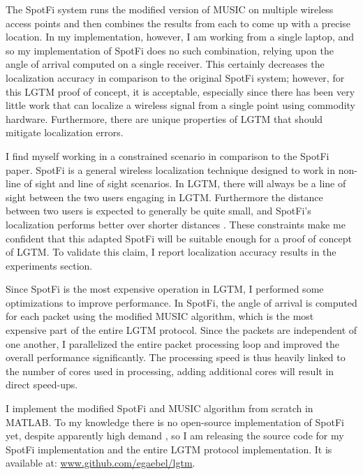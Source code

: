 \documentclass[12pt]{report}
\begin{document}
The SpotFi system runs the modified version of MUSIC on multiple wireless access points and then combines the results from each to come up with a precise location. In my implementation, however, I am working from a single laptop, and so my implementation of SpotFi does no such combination, relying upon the angle of arrival computed on a single receiver. This certainly decreases the localization accuracy in comparison to the original SpotFi system; however, for this LGTM proof of concept, it is acceptable, especially since there has been very little work that can localize a wireless signal from a single point using commodity hardware. Furthermore, there are unique properties of LGTM that should mitigate localization errors. \par

I find myself working in a constrained scenario in comparison to the SpotFi paper. SpotFi is a general wireless localization technique designed to work in non-line of sight and line of sight scenarios. In LGTM, there will always be a line of sight between the two users engaging in LGTM. Furthermore the distance between two users is expected to generally be quite small, and SpotFi's localization performs better over shorter distances \cite{SpotFiKotaru2015}. These constraints make me confident that this adapted SpotFi will be suitable enough for a proof of concept of LGTM. To validate this claim, I report localization accuracy results in the experiments section. \par

Since SpotFi is the most expensive operation in LGTM, I performed some optimizations to improve performance. In SpotFi, the angle of arrival is computed for each packet using the modified MUSIC algorithm, which is the most expensive part of the entire LGTM protocol. Since the packets are independent of one another, I parallelized the entire packet processing loop and improved the overall performance significantly. The processing speed is thus heavily linked to the number of cores used in processing, adding additional cores will result in direct speed-ups. \par

I implement the modified SpotFi and MUSIC algorithm from scratch in MATLAB. To my knowledge there is no open-source implementation of SpotFi yet, despite apparently high demand \cite{SpotFiCsiToolIssue2016}, so I am releasing the source code for my SpotFi implementation and the entire LGTM protocol implementation. It is available at: \url{www.github.com/egaebel/lgtm}. \par
\end{document}
